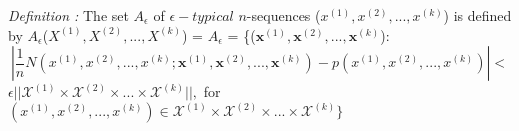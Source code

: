 \documentclass[preview]{standalone}
\begin{document}
\begin{center}
\textit{Definition :} The set $A_{\epsilon}$ of $\epsilon -typical$ $n$-sequences ($x^{(1)},x^{(2)},...,x^{(k)}$) is defined by $A_{\epsilon}$($X^{(1)},X^{(2)},...,X^{(k)}$) = $A_{\epsilon}$ = \{($\textbf{x}^{(1)},\textbf{x}^{(2)},...,\textbf{x}^{(k)}$):$$\left|\frac{1}{n} N ( x^{(1)},x^{(2)},...,x^{(k)};\textbf{x}^{(1)},\textbf{x}^{(2)},...,\textbf{x}^{(k)}) - p(x^{(1)},x^{(2)},...,x^{(k)} )\right| < $$ $\epsilon ||\mathscr{X}^{(1)} \times \mathscr{X}^{(2)} \times...\times \mathscr{X}^{(k)}||,$ for $(x^{(1)},x^{(2)},...,x^{(k)}) \in \mathscr{X}^{(1)} \times \mathscr{X}^{(2)} \times...\times \mathscr{X}^{(k)}\}$
\end{center}
\end{document}
